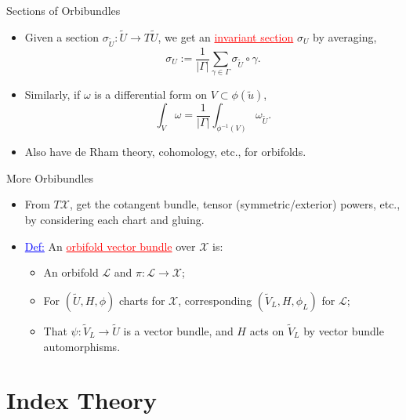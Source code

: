 \documentclass[aspectratio=169,xcolor=dvipsnames]{beamer}
\newcommand{\ra}{\rightarrow}
\newcommand{\w}{\omega}
\begin{document}
\begin{frame}{Sections of Orbibundles}
	\begin{itemize}
		\item Given a section $\sigma_{\widetilde{U}} : \widetilde{U} \ra T\widetilde{U}$, we get an \textcolor{red}{\underline{invariant section}} $\sigma_{U}$ by averaging,
		\[
		\sigma_{U} := \frac{1}{|\Gamma|}\sum_{\gamma \in \Gamma} \sigma_{\widetilde{U}} \circ \gamma.
		\]
		\item Similarly, if $\w$ is a differential form on $V \subset \phi(\widetilde{u})$,
		\[
		\int_{V} \w = \frac{1}{|\Gamma|}\int_{\phi^{-1}(V)} \w_{\widetilde{U}}.
		\]
		\item Also have de Rham theory, cohomology, etc., for orbifolds.
	\end{itemize}
\end{frame}

\begin{frame}{More Orbibundles}
	\begin{itemize}
		\item From $T\mathcal{X}$, get the cotangent bundle, tensor (symmetric/exterior) powers, etc., by considering each chart and gluing.
		\item \textcolor{blue}{\underline{Def:}} An \textcolor{red}{\underline{orbifold vector bundle}} over $\mathcal{X}$ is:
		\begin{itemize}
			\item An orbifold $\mathcal{L}$ and $\pi : \mathcal{L} \ra \mathcal{X}$;
			\item For $(\widetilde{U}, H, \phi)$ charts for $\mathcal{X}$, corresponding $(\widetilde{V}_{L}, H, \phi_{L})$ for $\mathcal{L}$;
			\item That $\psi : \widetilde{V}_{L} \ra \widetilde{U}$ is a vector bundle, and $H$ acts on $\widetilde{V}_{L}$ by vector bundle automorphisms.
		\end{itemize}
	\end{itemize}
\end{frame}

\section{Index Theory}
\end{document}
